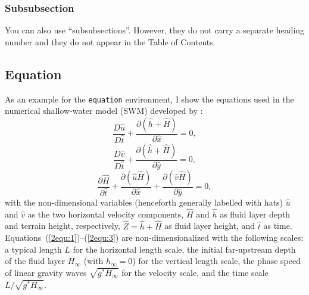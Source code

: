 \subsubsection{Subsubsection}
You can also use ``subsubsections''. However, they do not carry a separate
heading number and they do not appear in the Table of Contents.

\subsection{Equation}
As an example for the \verb|equation| environment, I show the equations used in
the numerical shallow-water model (SWM) developed by
\citet{scha93Aag,scha93Bag}:
\begin{equation}
\frac{D\hat{u}}{D\hat{t}}+\frac{\partial(\hat{h}+\hat{H})}
                               {\partial\hat{x}}=0,
\label{2equ:1}
\end{equation}
\begin{equation}
\frac{D\hat{v}}{D\hat{t}}+\frac{\partial(\hat{h}+\hat{H})}
                               {\partial\hat{y}}=0,
\label{2equ:2}
\end{equation}
\begin{equation}
\frac{\partial\hat{H}}{\partial\hat{t}}+\frac{\partial(\hat{u}\hat{H})}
                                             {\partial\hat{x}}
                                       +\frac{\partial(\hat{v}\hat{H})}
                                             {\partial\hat{y}}
                                                =0,
\label{2equ:3}
\end{equation}
with the non-dimensional variables (henceforth generally labelled with hats)
$\hat{u}$ and $\hat{v}$ as the two horizontal velocity components, $\hat{H}$ and
$\hat{h}$ as fluid layer depth and terrain height, respectively,
$\hat{Z}=\hat{h}+\hat{H}$ as fluid layer height, and $\hat{t}$ as time.
Equations~(\ref{2equ:1})--(\ref{2equ:3}) are non-dimensionalized with the
following scales: a typical length $L$ for the horizontal length scale, the
initial far-upstream depth of the fluid layer $H_{\infty}$ (with $h_{\infty}=0$)
for the vertical length scale, the phase speed of linear gravity waves
$\sqrt{g^*H_{\infty}}$ for the velocity scale, and the time scale
$L/\sqrt{g^*H_{\infty}}$.
